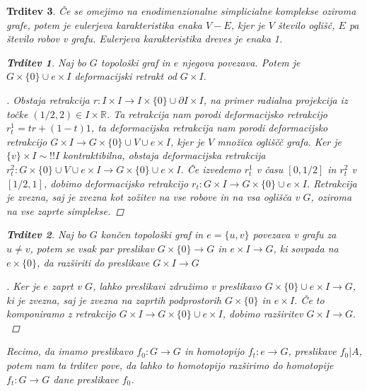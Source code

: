 \documentclass[a4paper,12pt]{article}
\theoremstyle{definition}
\theoremstyle{plain}
\theoremstyle{definition}
\theoremstyle{plain}
\newtheorem{trditev}{Trditev}
\theoremstyle{plain}
\theoremstyle{plain}
\theoremstyle{plain}
\newenvironment{dokaz}{\begin{proof}[\bfseries\upshape\proofname]}{\end{proof}}
\begin{document}
\begin{trditev}
Če se omejimo na enodimenzionalne simplicialne komplekse oziroma grafe, 
potem je eulerjeva karakteristika enaka $V-E$, kjer je $V$ število 
oglišč, $E$ pa 
število robov v grafu. Eulerjeva karakteristika dreves je enaka 1.

\begin{trditev}
    Naj bo $G$ topološki graf in $e$ njegova povezava. Potem je
    $G\times \{0\}\cup e\times I$ deformacijski retrakt od $G\times I$.
\end{trditev}

\begin{dokaz}
    Obstaja retrakcija $r: I\times I \rightarrow I\times \{0\} \cup \partial I \times I$, na primer radialna projekcija iz točke $(1/2,2)\in I\times \mathbb{R}$. Ta retrakcija nam porodi deformacijsko retrakcijo $r^1_t=tr+(1-t)1$, ta deformacijska retrakcija nam porodi deformacijsko retrakcijo $G\times I \rightarrow G\times\{0\} \cup {V\cup e \times I}$, kjer je $V$ množica ogliščč grafa. Ker je $\{v\}\times I\sim!! I$ kontraktibilna, obstaja deformacijska retrakcija $r^2_t: G\times\{0\} \cup {V\cup e \times I}\rightarrow G\times\{0\} \cup { e \times I}$. Če izvedemo $r_t^1$ v času $[0,1/2]$ in $r^2_t$ v $[1/2,1]$, dobimo deformacijsko retrakcijo $r_t:G\times I \rightarrow G\times\{0\} \cup {e \times I}$. Retrakcija je zvezna, saj je zvezna kot zožitev na vse robove in na vsa oglišča v $G$, oziroma na vse zaprte simplekse.
\end{dokaz}

\begin{trditev}
    Naj bo $G$ končen topološki graf in  $e=\{u,v\}$ povezava v grafu za $u\neq v$, potem se vsak par preslikav $G\times \{0\}\rightarrow G$ in $e\times I \rightarrow G$, ki sovpada na $e\times \{0\}$, da razširiti do preslikave $G\times I \rightarrow G$
\end{trditev}

\begin{dokaz}
    Ker je $e$ zaprt v $G$, lahko preslikavi združimo v preslikavo $G\times \{0\}\cup e\times I\rightarrow G$, ki je zvezna, saj je zvezna na zaprtih podprostorih $G\times \{0\}$ in $e\times I$. Če to komponiramo z retrakcijo $G\times I \rightarrow G\times \{0\}\cup e\times I$, dobimo razširitev $G\times I \rightarrow G.$
\end{dokaz}

Recimo, da imamo preslikavo $f_0:G\rightarrow G$ in homotopijo $f_t:e\rightarrow G$, preslikave $f_0|A$, potem nam ta trditev pove, da lahko to homotopijo razširimo do homotopije $f_t:G\rightarrow G$ dane preslikave $f_0$.


\end{trditev}
\end{document}
